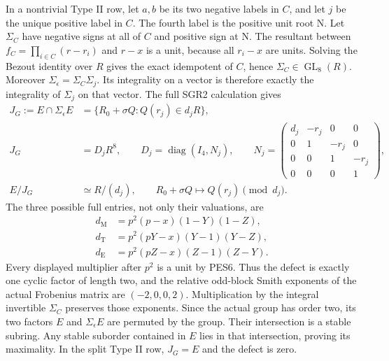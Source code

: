 \documentclass[11pt]{article}
\begin{document}
In a nontrivial Type II row, let $a,b$ be its two negative labels
in $C$, and let $j$ be the unique positive label in $C$.
The fourth label is the positive unit root $\mathrm N$.
Let $\Sigma_C$ have negative signs at all of $C$ and positive sign
at $\mathrm N$. The resultant between
$f_C=\prod_{i\in C}(r-r_i)$ and $r-x$ is a unit, because all
$r_i-x$ are units. Solving the Bezout identity over $R$ gives the
exact idempotent of $C$, hence $\Sigma_C\in\operatorname{GL}_8(R)$.
Moreover $\Sigma_\epsilon=\Sigma_C\Sigma_j$. Its integrality on a
vector is therefore exactly the integrality of $\Sigma_j$ on that
vector. The full SGR2 calculation gives
\[
\begin{aligned}
 J_G:=E\cap\Sigma_\epsilon E
   &=\{R_0+\sigma Q:Q(r_j)\in d_jR\},\\
 J_G&=D_jR^8,\qquad
 D_j=\operatorname{diag}(I_4,N_j),\qquad
 N_j=\begin{pmatrix}
 d_j&-r_j&0&0\\0&1&-r_j&0\\0&0&1&-r_j\\0&0&0&1
 \end{pmatrix},\\
 E/J_G&\simeq R/(d_j),\qquad
 R_0+\sigma Q\longmapsto Q(r_j)\pmod {d_j}.
\end{aligned}                                                   \tag{SLF12}
\]
The three possible full entries, not only their valuations, are
\[
\begin{aligned}
 d_{\mathrm M}&=p^2(p-x)(1-Y)(1-Z),\\
 d_{\mathrm T}&=p^2(pY-x)(Y-1)(Y-Z),\\
 d_{\mathrm E}&=p^2(pZ-x)(Z-1)(Z-Y).
\end{aligned}                                                   \tag{SLF13}
\]
Every displayed multiplier after $p^2$ is a unit by PES6.
Thus the defect is exactly one cyclic factor of length two,
and the relative odd-block Smith exponents of the actual Frobenius
matrix are $(-2,0,0,2)$. Multiplication by the integral invertible
$\Sigma_C$ preserves those exponents. Since the actual group has
order two, its two factors $E$ and $\Sigma_\epsilon E$ are permuted
by the group. Their intersection is a stable subring. Any stable
suborder contained in $E$ lies in that intersection, proving its
maximality. In the split Type II row, $J_G=E$ and the defect is zero.
\end{document}
